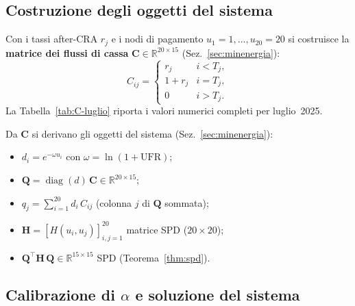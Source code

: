 \documentclass[11pt,a4paper]{article}
\theoremstyle{plain}
\theoremstyle{definition}
\theoremstyle{remark}
\newcommand{\UFR}{\ensuremath{\mathrm{UFR}}}
\newcommand{\CRA}{\ensuremath{\mathrm{CRA}}}
\newcommand{\Qmat}{\mathbf{Q}}
\newcommand{\Hmat}{\mathbf{H}}
\begin{document}


\subsection{Costruzione degli oggetti del sistema}

Con i tassi after-CRA $r_j$ e i nodi di pagamento $u_1=1,\dots,u_{20}=20$ si costruisce
la \textbf{matrice dei flussi di cassa} $\mathbf{C} \in \mathbb{R}^{20 \times 15}$
(Sez.~\ref{sec:minenergia}):
\[
  C_{ij} = \begin{cases}
    r_j     & i < T_j,\\
    1 + r_j & i = T_j,\\
    0       & i > T_j.
  \end{cases}
\]
La Tabella~\ref{tab:C-luglio} riporta i valori numerici completi per luglio~2025.



Da $\mathbf{C}$ si derivano gli oggetti del sistema (Sez.~\ref{sec:minenergia}):
\begin{itemize}
  \item $d_i = e^{-\omega u_i}$ con $\omega = \ln(1{+}\UFR)$;
  \item $\Qmat = \operatorname{diag}(d)\,\mathbf{C} \in \mathbb{R}^{20\times 15}$;
  \item $q_j = \sum_{i=1}^{20} d_i\, C_{ij}$ (colonna $j$ di $\Qmat$ sommata);
  \item $\Hmat = [H(u_i,u_j)]_{i,j=1}^{20}$ matrice SPD ($20\times 20$);
  \item $\Qmat^\top \Hmat\, \Qmat \in \mathbb{R}^{15\times 15}$ SPD (Teorema~\ref{thm:spd}).
\end{itemize}

\subsection{Calibrazione di $\alpha$ e soluzione del sistema}
\end{document}

